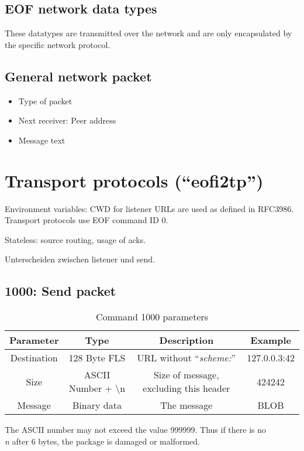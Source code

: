\documentclass[12pt,a4paper]{book}
\begin{document}
\subsection{EOF network data types}
These datatypes are transmitted over the network and are only
encapsulated by the specific network protocol.
\subsection{General network packet}
\begin{itemize}
\item Type of packet
\item Next receiver: Peer address
\item Message text
\end{itemize}

\section{Transport protocols ("`eofi2tp"')}
Environment variables: CWD for listener
URLs are used as defined in RFC3986\cite{uri-1}.
Transport protocols use EOF command ID 0.

Stateless: source routing, usage of acks.

Unterscheiden zwischen listener und send.
\subsection{1000: Send packet}
\begin{longtable}{|c|c|c|c|}
\caption{Command 1000 parameters}\\
\hline
\textbf{Parameter} & \textbf{Type} & \textbf{Description} & \textbf{Example}\\
\hline
Destination & 128 Byte FLS &URL without "`\emph{scheme:}"' & 127.0.0.3:42\\
\hline
Size & ASCII Number + \textbackslash{}n & Size of message, excluding this header & 424242\\
\hline
Message & Binary data & The message & BLOB\\
\hline
\end{longtable}
The ASCII number may not exceed the value 999999. Thus if there is no
\emph{\\n} after 6 bytes, the package is damaged or malformed.
\end{document}
